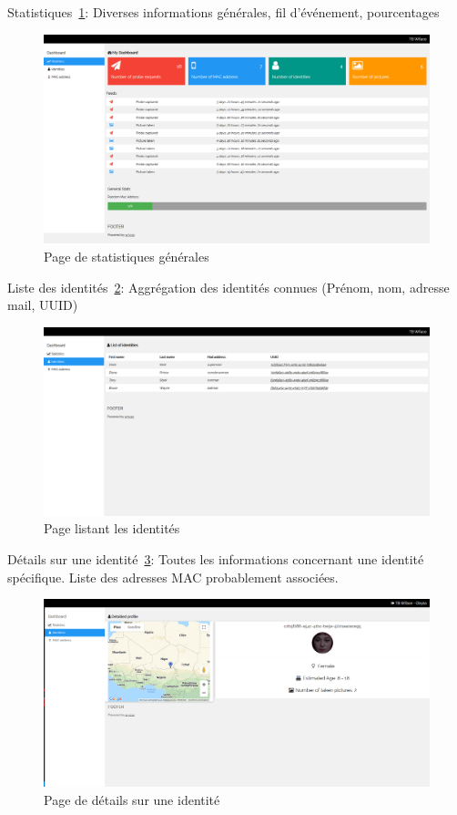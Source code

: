 Statistiques~\ref{fig:dashboard_stats}: Diverses informations générales, fil d'événement, pourcentages
\begin{figure}[H]
	\centering
	\includegraphics[width=16cm]{images/dashboard/stats.png}
	\caption{Page de statistiques générales}
	\label{fig:dashboard_stats}
\end{figure}

Liste des identités~\ref{fig:dashboard_list_identities}: Aggrégation des identités connues (Prénom, nom, adresse mail, UUID)
\begin{figure}[H]
	\centering
	\includegraphics[width=16cm]{images/dashboard/list-identities.png}
	\caption{Page listant les identités}
	\label{fig:dashboard_list_identities}
\end{figure}

Détails sur une identité~\ref{fig:identity_details}: Toutes les informations concernant une identité spécifique. Liste des adresses MAC probablement associées. 
\begin{figure}[H]
	\centering
	\includegraphics[width=16cm]{images/dashboard/identity.png}
	\caption{Page de détails sur une identité}
	\label{fig:identity_details}
\end{figure}

